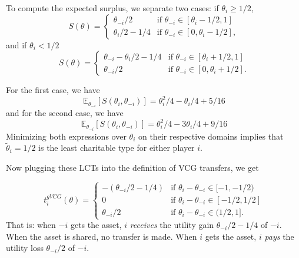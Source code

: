 \documentclass[a4paper]{article}
\begin{document}
\begin{enumerate}
		
		
		To compute the expected surplus, we separate two cases: if $\theta_{i}\geq1/2$,
		$$S(\theta)=
		\begin{cases}
			\theta_{-i}/2 
			&\text{if $\theta_{-i} \in [\theta_i-1/2, 1]$} \\
			\theta_{i} / 2-1/4
			&\text{if $\theta_{-i} \in [0,\theta_i-1/2]$},
		\end{cases}$$
		and if $\theta_i<1/2$
		$$S(\theta)=
		\begin{cases}
			\theta_{-i} - \theta_{i}/2 - 1/4
			&\text{if $\theta_{-i} \in [\theta_i+1/2, 1]$} \\
			\theta_{-i}/2
			&\text{if $\theta_{-i} \in [0,\theta_i+1/2]$}.
		\end{cases}$$
		
		For the first case, we have
		\begin{equation*}
			\mathbb{E}_{\theta_{-i}}[S(\theta_i,\theta_{-i})] = \theta_i^2/4 - \theta_i/4 + 5/16
		\end{equation*}
		and for the second case, we have 
		\begin{equation*}
			\mathbb{E}_{\theta_{-i}}[S(\theta_i,\theta_{-i})] = \theta_i^2/4 - 3\theta_i/4 + 9/16
		\end{equation*}
		Minimizing both expressions over $\theta_i$ on their respective domains implies that $\tilde{\theta}_i=1/2$ is the least charitable type for either player $i$.
		
		
		Now plugging these LCTs into the definition of VCG transfers, we get
		
		\begin{equation*}
			t^{gVCG}_i(\theta)
			= 
			\begin{cases}
				- \left( \theta_{-i}/2 - 1/4 \right)
				&\text{if $\theta_i-\theta_{-i} \in [-1,-1/2)$} \\
				0
				&\text{if $\theta_i-\theta_{-i} \in [-1/2,1/2]$} \\
				\theta_{-i}/2
				&\text{if $\theta_i-\theta_{-i} \in (1/2,1]$} .
			\end{cases}
		\end{equation*}
		That is: when $-i$ gets the asset, $i$ \emph{receives} the utility gain $\theta_{-i}/2 - 1/4$ of $-i$. When the asset is shared, no transfer is made. When $i$ gets the asset, $i$ \emph{pays} the utility loss $\theta_{-i}/2$ of $-i$.
	\end{enumerate}
\fi
\end{document}
